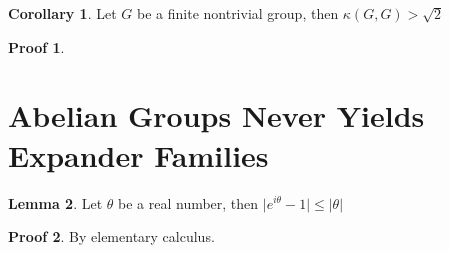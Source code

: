 \documentclass{book}
\newcommand{\abs}[1]{\lvert #1 \rvert }
\theoremstyle{definition}
\newtheorem{lemma}{Lemma}[chapter]
\newtheorem{corollary}[lemma]{Corollary}
\theoremstyle{remarkstyle}
\newtheorem*{myproof}{Proof}%
\begin{document}
\begin{corollary}
    Let $G$ be a finite nontrivial group, then $\kappa(G,G)>\sqrt{2}$
\end{corollary}
\begin{myproof}

\end{myproof}





\section{Abelian Groups Never Yields Expander Families}
\begin{lemma}
    Let $\theta$ be a real number, then $\abs{e^{i\theta}-1}\le\abs{\theta}$
\end{lemma}
\begin{myproof}
    By elementary calculus. \newline 
\end{myproof}
\end{document}
